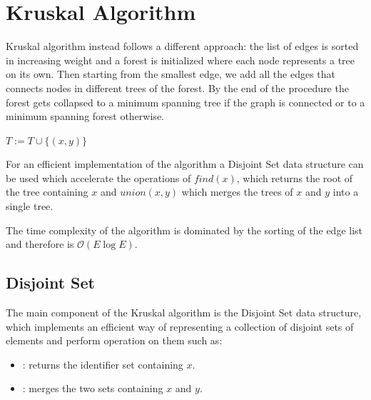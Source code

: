 \documentclass{article}
\begin{document}
\section{Kruskal Algorithm}

Kruskal algorithm instead follows a different approach: the list of edges is sorted in increasing weight and a forest is initialized where each node represents a tree on its own. Then starting from the smallest edge, we add all the edges that connects nodes in different trees of the forest. By the end of the procedure the forest gets collapsed to a minimum spanning tree if the graph is connected or to a minimum spanning forest otherwise.

\begin{algorithm}
    \begin{algorithmic}
         
             
                    \State {}
                    \State $T := T \cup \{(x, y)\}$
                \EndIf
            \EndFor
        \EndFunction
    \end{algorithmic}
\end{algorithm}

For an efficient implementation of the algorithm a Disjoint Set data structure can be used which accelerate the operations of $find(x)$, which returns the root of the tree containing $x$ and $union(x, y)$ which merges the trees of $x$ and $y$ into a single tree.

The time complexity of the algorithm is dominated by the sorting of the edge list and therefore is $\mathcal{O}(E\log E)$.

\subsection{Disjoint Set}

The main component of the Kruskal algorithm is the Disjoint Set data structure, which implements an efficient way of representing a collection of disjoint sets of elements and perform operation on them such as:
\begin{itemize}
    \item {}: returns the identifier set containing $x$.
    \item {}: merges the two sets containing $x$ and $y$.
\end{itemize}
\end{document}
